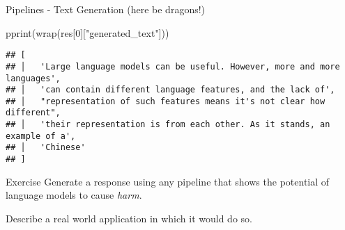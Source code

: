 \documentclass[
  10pt,
  ignorenonframetext,
  aspectratio=169]{beamer}
\newenvironment{Shaded}{\begin{snugshade}}{\end{snugshade}}
\newcommand{\DecValTok}[1]{\textcolor[rgb]{0.86,0.86,0.80}{#1}}
\newcommand{\NormalTok}[1]{\textcolor[rgb]{0.80,0.80,0.80}{#1}}
\newcommand{\StringTok}[1]{\textcolor[rgb]{0.80,0.58,0.58}{#1}}
\begin{document}
\begin{frame}[fragile]{Pipelines - Text Generation (here be dragons!)}
\begin{Shaded}
\begin{Highlighting}[]
\NormalTok{pprint(wrap(res[}\DecValTok{0}\NormalTok{][}\StringTok{"generated\_text"}\NormalTok{]))}
\end{Highlighting}
\end{Shaded}

\begin{verbatim}
## [
## │   'Large language models can be useful. However, more and more languages',
## │   'can contain different language features, and the lack of',
## │   "representation of such features means it's not clear how different",
## │   'their representation is from each other. As it stands, an example of a',
## │   'Chinese'
## ]
\end{verbatim}
\end{frame}

\begin{frame}{Exercise}
\protect\hypertarget{exercise}{}
Generate a response using any pipeline that shows the potential of
language models to cause \emph{harm}.

Describe a real world application in which it would do so.
\end{frame}
\end{document}
